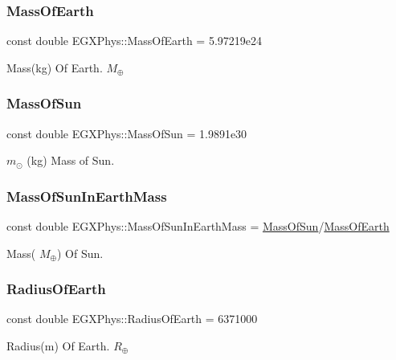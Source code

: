 \subsubsection{\texorpdfstring{Mass\+Of\+Earth}{MassOfEarth}}
{\footnotesize\ttfamily const double E\+G\+X\+Phys\+::\+Mass\+Of\+Earth = 5.\+97219e24}

Mass(kg) Of Earth. $M_\oplus$ \mbox{\label{namespace_e_g_x_phys_a6e84ae13f1dbcecb215af787bbc12cd6}} 
\subsubsection{\texorpdfstring{Mass\+Of\+Sun}{MassOfSun}}
{\footnotesize\ttfamily const double E\+G\+X\+Phys\+::\+Mass\+Of\+Sun = 1.\+9891e30}

$m_\odot$ (kg) Mass of Sun. \mbox{\label{namespace_e_g_x_phys_a05709972a6a6089eb968f667ce0bf656}} 
\subsubsection{\texorpdfstring{Mass\+Of\+Sun\+In\+Earth\+Mass}{MassOfSunInEarthMass}}
{\footnotesize\ttfamily const double E\+G\+X\+Phys\+::\+Mass\+Of\+Sun\+In\+Earth\+Mass = \mbox{\hyperlink{namespace_e_g_x_phys_a6e84ae13f1dbcecb215af787bbc12cd6}{Mass\+Of\+Sun}}/\mbox{\hyperlink{namespace_e_g_x_phys_ace4a9d8c0b21215536857f4c1087a4e8}{Mass\+Of\+Earth}}}

Mass( $M_\oplus$) Of Sun. \mbox{\label{namespace_e_g_x_phys_a11a2d4a914eb43c4095e225358293a45}} 
\subsubsection{\texorpdfstring{Radius\+Of\+Earth}{RadiusOfEarth}}
{\footnotesize\ttfamily const double E\+G\+X\+Phys\+::\+Radius\+Of\+Earth = 6371000}

Radius(m) Of Earth. $R_\oplus$ \mbox{\label{namespace_e_g_x_phys_a983b842cceb4a584787874fc9486384d}} 
